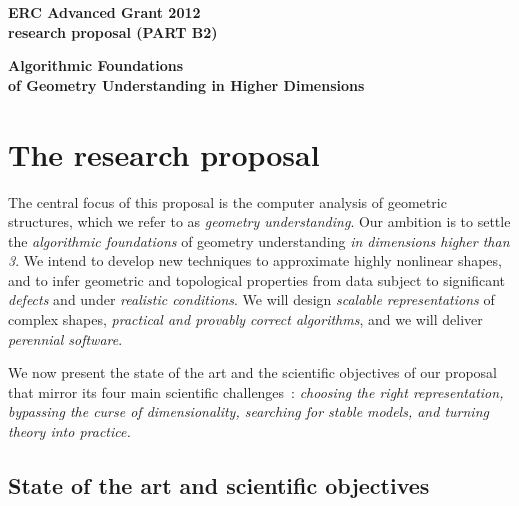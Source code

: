 \thispagestyle{empty}

\mbox{}\vspace{-3.5cm}

\begin{center}
{\Large
{\bf ERC Advanced Grant 2012 \\ research proposal (PART B2)}}
\vspace{1cm}

{\LARGE {\bf  Algorithmic Foundations \\ of 
Geometry Understanding in Higher Dimensions}

\vspace{3mm} 

}
\end{center}
\section{The research proposal}

The central focus of this  proposal is  the computer analysis of geometric structures, which we refer to as {\em geometry understanding}. Our ambition is to settle the {\em algorithmic foundations} of geometry understanding  {\em in dimensions higher than 3}. We intend to develop new techniques to approximate highly nonlinear shapes, and to infer geometric and topological properties from data subject to significant {\em defects} and under {\em realistic conditions}. 
We will design {\em scalable representations} of complex shapes,  {\em practical and provably correct algorithms}, and we will deliver {\em perennial software}.

We now present the state of the art and the scientific objectives of our proposal that mirror its four main scientific challenges~: {\em choosing the right representation, bypassing the curse of dimensionality, searching for stable models, and turning theory into practice.}


\subsection{State of the art and scientific objectives}

